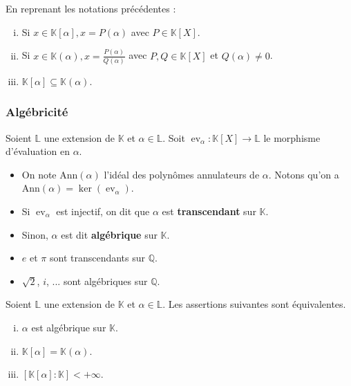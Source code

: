 	\begin{proposition}
		En reprenant les notations précédentes :
		\begin{enumerate}[(i)]
			\item Si $x \in \mathbb{K}[\alpha], x = P(\alpha)$ avec $P \in \mathbb{K}[X]$.
			\item Si $x \in \mathbb{K}(\alpha), x = \frac{P(\alpha)}{Q(\alpha)}$ avec $P, Q \in \mathbb{K}[X]$ et $Q(\alpha) \neq 0$.
			\item $\mathbb{K}[\alpha] \subseteq \mathbb{K}(\alpha)$.
		\end{enumerate}
	\end{proposition}
	
	\subsubsection{Algébricité}
	
	\begin{definition}
		Soient $\mathbb{L}$ une extension de $\mathbb{K}$ et $\alpha \in \mathbb{L}$. Soit $\operatorname{ev}_\alpha : \mathbb{K}[X] \rightarrow \mathbb{L}$ le morphisme d'évaluation en $\alpha$.
		\begin{itemize}
			\item On note $\mathrm{Ann}(\alpha)$ l'idéal des polynômes annulateurs de $\alpha$. Notons qu'on a $\mathrm{Ann}(\alpha) = \ker(\operatorname{ev}_\alpha)$.
			\item Si $\operatorname{ev}_\alpha$ est injectif, on dit que $\alpha$ est \textbf{transcendant} sur $\mathbb{K}$.
			\item Sinon, $\alpha$ est dit \textbf{algébrique} sur $\mathbb{K}$.
		\end{itemize}
	\end{definition}
	
	\begin{example}
		\begin{itemize}
			\item $e$ et $\pi$ sont transcendants sur $\mathbb{Q}$.
			\item $\sqrt{2}$, $i$, ... sont algébriques sur $\mathbb{Q}$.
		\end{itemize}
	\end{example}
	
	\begin{proposition}
		Soient $\mathbb{L}$ une extension de $\mathbb{K}$ et $\alpha \in \mathbb{L}$. Les assertions suivantes sont équivalentes.
		\begin{enumerate}[(i)]
			\item $\alpha$ est algébrique sur $\mathbb{K}$.
			\item $\mathbb{K}[\alpha] = \mathbb{K}(\alpha)$.
			\item $[\mathbb{K}[\alpha]:\mathbb{K}] < +\infty$.
		\end{enumerate}
	\end{proposition}
	
